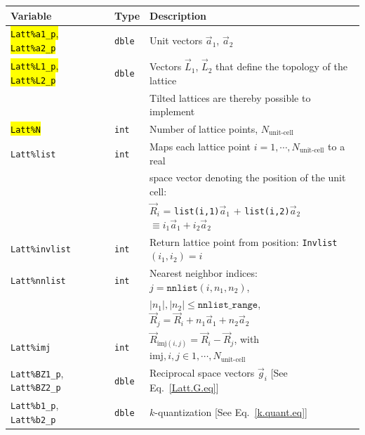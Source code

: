 %
\begin{table}[h!]
	\begin{center}
   \begin{tabular}{@{} l l @{$\;\;$} l @{}}\toprule
    Variable  & Type & Description \\\midrule
     \hl{\texttt{Latt\%a1\_p}, \texttt{Latt\%a2\_p}}   & \texttt{dble}  & Unit vectors $\vec{a}_1$,  $\vec{a}_2$ \\ 
     \hl{\texttt{Latt\%L1\_p}, \texttt{Latt\%L2\_p}}   & \texttt{dble}  & Vectors $\vec{L}_1$, $\vec{L}_2$ that define the topology of the  lattice \\
     									               &                &  Tilted lattices are  thereby possible to implement \\
    \hl{\texttt{Latt\%N}}                              & \texttt{int}   &  Number of lattice points, $N_{\text{unit-cell}}$ \\
    \texttt{Latt\%list}                                & \texttt{int}   &  Maps each lattice point $i=1,\cdots, N_{\text{unit-cell}}$ to a real\\
                                                                    &   &  space vector denoting the position of the unit cell: \\
                                                                    &   & $\vec{R}_i$ = \texttt{list(i,1)}$\vec{a}_1$ + \texttt{list(i,2)}$\vec{a}_2$  $  \equiv i_1  \vec{a}_1 + i_2  \vec{a}_2 $ \\
    \texttt{Latt\%invlist}                             & \texttt{int}   &  Return lattice point from position: \texttt{Invlist}$(i_1,i_2) = i $ \\
    \texttt{Latt\%nnlist}                              & \texttt{int}   &  Nearest neighbor indices: $j = \texttt{nnlist} (i, n_1, n_2) $, \\
                                                       &                &  $|n_1|, |n_2| \leq  \texttt{nnlist\_range} $, $\vec{R}_j = \vec{R}_i + n_1 \vec{a}_1  + n_2 \vec{a}_2 $ \\
   \texttt{Latt\%imj}                                  & \texttt{int}   &  $\vec{R}_{\mathrm{imj}(i,j)}  =  \vec{R}_i -  \vec{R}_j$, with  $\mathrm{imj}, i, j \in  1,\cdots, N_{\text{unit-cell}}$ \\
    \texttt{Latt\%BZ1\_p}, \texttt{Latt\%BZ2\_p}       & \texttt{dble}  & Reciprocal space vectors $\vec{g}_i$   [See Eq.~\eqref{Latt.G.eq}] \\
    \texttt{Latt\%b1\_p}, \texttt{Latt\%b2\_p}          & \texttt{dble}  &  $k$-quantization [See Eq.~\eqref{k.quant.eq}] \\

\end{tabular}
\end{center}
\end{table}
